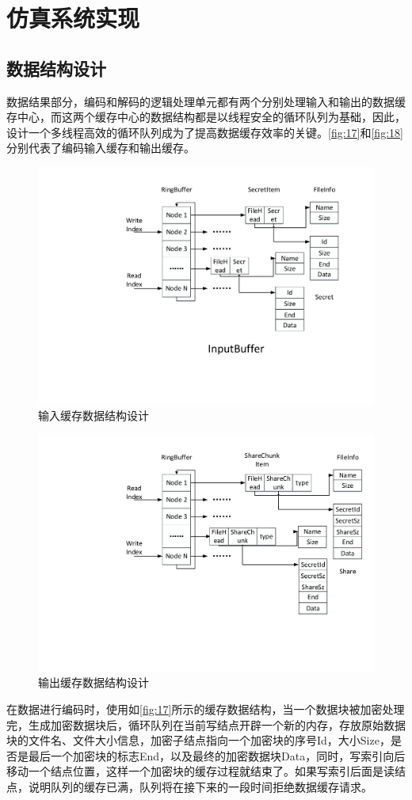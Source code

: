\section{仿真系统实现}
\subsection{数据结构设计}
数据结果部分，编码和解码的逻辑处理单元都有两个分别处理输入和输出的数据缓存中心，而这两个缓存中心的数据结构都是以线程安全的循环队列为基础，因此，设计一个多线程高效的循环队列成为了提高数据缓存效率的关键。\autoref{fig:17}和\autoref{fig:18}分别代表了编码输入缓存和输出缓存。
\begin{figure}[H]
	\centering
	\includegraphics[width=1\textwidth]{Pics/input-buf.pdf}
	\caption{输入缓存数据结构设计}
	\label{fig:17}
\end{figure}
\begin{figure}[H]
	\centering
	\includegraphics[width=1\textwidth]{Pics/output-buf.pdf}
	\caption{输出缓存数据结构设计}
	\label{fig:18}
\end{figure}
在数据进行编码时，使用如\autoref{fig:17}所示的缓存数据结构，当一个数据块被加密处理完，生成加密数据块后，循环队列在当前写结点开辟一个新的内存，存放原始数据块的文件名、文件大小信息，加密子结点指向一个加密块的序号Id，大小Size，是否是最后一个加密块的标志End，以及最终的加密数据块Data，同时，写索引向后移动一个结点位置，这样一个加密块的缓存过程就结束了。如果写索引后面是读结点，说明队列的缓存已满，队列将在接下来的一段时间拒绝数据缓存请求。


